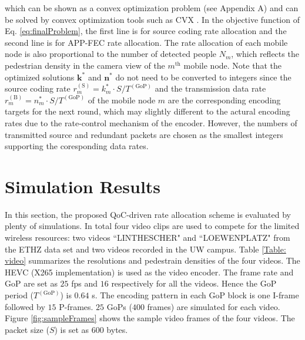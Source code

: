 \documentclass[journal]{IEEEtran}
\begin{document}
which can be shown as a convex optimization problem \cite{BoVa04} (see Appendix A) and can be solved by convex optimization tools such as CVX \cite{CVX}. In the objective function of Eq. \eqref{eq:finalProblem}, the first line is for source coding rate allocation and the second line is for APP-FEC rate allocation. The rate allocation of each mobile node is also proportional to the number of detected people $N_m$, which reflects the pedestrian density in the camera view of the $m^{\text{th}}$ mobile node. Note that the optimized solutions $\mathbf{k}^*$ and $\mathbf{n}^*$ do not need to be converted to integers since the source coding rate $r_m^{\left(\text{S}\right)}=k_m^*\cdot S/T^{\left(\text{GoP}\right)}$ and the transmission data rate $r_m^{\left(\text{B}\right)}=n_m^*\cdot S/T^{\left(\text{GoP}\right)}$ of the mobile node $m$ are the corresponding encoding targets for the next round, which may slightly different to the actural encoding rates due to the rate-control mechanism of the encoder. However, the numbers of transmitted source and redundant packets are chosen as the smallest integers supporting the coresponding data rates.

\section{Simulation Results}
In this section, the proposed QoC-driven rate allocation scheme is evaluated by plenty of simulations. In total four video clips are used to compete for the limited wireless resources: two videos ``LINTHESCHER" and ``LOEWENPLATZ" from the ETHZ data set \cite{ELSG08} and two videos recorded in the UW campus. Table \ref{Table: video} summarizes the resolutions and pedestrain densities of the four videos. The HEVC (X265 implementation) \cite{X265} is used as the video encoder. The frame rate and GoP are set as $25$ fps and $16$ respectively for all the videos. Hence the GoP period ($T^{\left(\text{GoP}\right)}$) is $0.64$ s. The encoding pattern in each GoP block is one I-frame followed by $15$ P-frames. $25$ GoPs ($400$ frames) are simulated for each video. Figure \ref{fig:sampleFrames} shows the sample video frames of the four videos. The packet size ($S$) is set as $600$ bytes.
\end{document}
